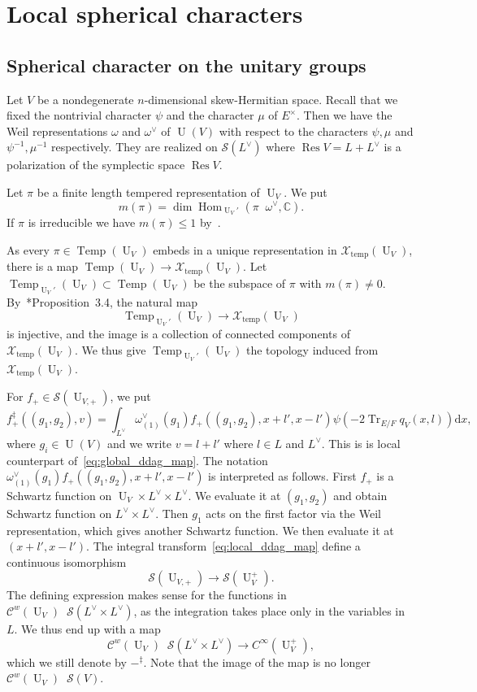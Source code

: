 \documentclass[letterpaper,11pt]{amsart}
\newcommand{\C}{\mathbb{C}}
\newcommand{\cC}{\mathcal{C}}
\newcommand{\cS}{\mathcal{S}}
\newcommand{\cX}{\mathcal{X}}
\newcommand{\rd}{\mathrm{d}}
\newcommand{\<}{\negthickspace}
\DeclareMathOperator{\Tr}{Tr}
\DeclareMathOperator{\U}{U}
\DeclareMathOperator{\Res}{Res}
\DeclareMathOperator{\Hom}{Hom}
\DeclareMathOperator{\Temp}{Temp} \DeclareMathOperator{\temp}{temp}
\DeclareMathOperator{\otimeshat}{\widehat{\otimes}}
\theoremstyle{definition}
\theoremstyle{plain}
\theoremstyle{remark}
\numberwithin{equation}{section}
\begin{document}
\section{Local spherical characters}

\subsection{Spherical character on the unitary groups}
\label{subsec:tempered_intertwining}

Let $V$ be a nondegenerate $n$-dimensional skew-Hermitian space. Recall that we fixed the nontrivial character $\psi$ and the character $\mu$ of $E^\times$. Then we have the Weil representations $\omega$
and $\omega^\vee$ of $\U(V)$ with respect to the characters $\psi, \mu$
and $\psi^{-1}, \mu^{-1}$ respectively. They are realized on
$\cS(L^\vee)$  where $\Res V =
L+L^\vee$ is a polarization of the symplectic space $\Res V$.

Let $\pi$ be a finite length tempered representation of $\U_V$. We put
    \[
    m(\pi) = \dim \Hom_{\U_V'}(\pi \otimeshat \omega^\vee, \C).
    \]
If $\pi$ is irreducible we have $m(\pi) \leq 1$ by~\cites{Sun,SZ}.


As every $\pi \in \Temp(\U_V)$ embeds in a unique representation in
$\cX_{\temp}(\U_V)$, there is a map $\Temp(\U_V) \to \cX_{\temp}(\U_V)$. Let
$\Temp_{\U_V'}(\U_V) \subset \Temp(\U_V)$ be the subspace of $\pi$ with
$m(\pi) \not=0$. By~\cite{Xue6}*{Proposition~3.4}, the natural map
    \[
    \Temp_{\U_V'}(\U_V) \to \cX_{\temp}(\U_V)
    \]
is injective, and the image is a collection of connected components of
$\cX_{\temp}(\U_V)$. We thus give $\Temp_{\U_V'}(\U_V)$ the topology induced
from $\cX_{\temp}(\U_V)$.

For $f_+ \in \cS(\U_{V,+})$, we put
    \begin{equation}    \label{eq:local_ddag_map}
    f_+^\ddag((g_1, g_2), v) = \int_{L^\vee} \omega_{(1)}^\vee(g_1)
    f_+((g_1, g_2), x+l', x-l')
    \psi( - 2\Tr_{E/F} q_V(x, l) ) \rd x,
    \end{equation}
where $g_i \in \U(V)$ and we write $v = l + l'$ where $l \in L$ and $L^\vee$.
This is is local counterpart of~\eqref{eq:global_ddag_map}. The notation $\omega_{(1)}^\vee(g_1)    f_+((g_1, g_2), x+l', x-l')$ is interpreted as follows. First $f_+$ is a Schwartz function on $\U_V \times L^\vee \times L^\vee$. We evaluate it at $(g_1, g_2)$ and obtain Schwartz function on $L^\vee \times L^\vee$. Then $g_1$ acts on the first factor via the Weil representation, which gives another Schwartz function. We then evaluate it at $(x+l', x-l')$. The integral transform~\eqref{eq:local_ddag_map} define a
continuous isomorphism
    \[
    \cS(\U_{V,+}) \to \cS(\U_{V}^+).
    \]
The defining expression makes sense for the functions in $\cC^w(\U_V)
\otimeshat \cS(L^\vee \times L^\vee)$, as the integration takes place only in the
variables in $L$. We thus end up with a map
    \[
    \cC^w(\U_V) \otimeshat \cS(L^\vee \times L^\vee) \to C^\infty(\U_V^+),
    \]
which we still denote by $-^\ddag$. Note that the image of the map is no
longer $\cC^w(\U_V) \otimeshat \cS(V)$.
\end{document}
